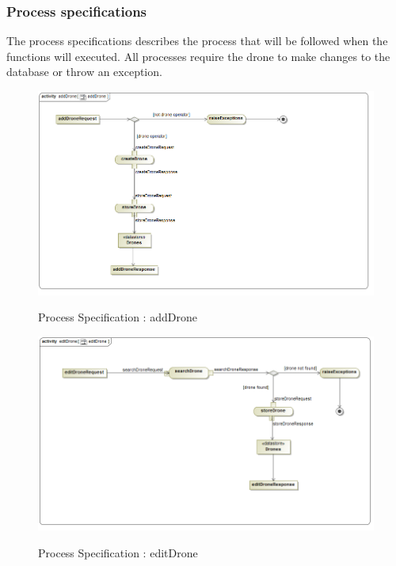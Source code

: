 \documentclass{article}
\begin{document}
	\subsubsection{Process specifications}
	The process specifications describes the process that will be followed when the functions will executed. All processes require the drone to make changes to the database or throw an exception.
		\begin{figure}[H]
			\includegraphics[width=\textwidth]{ps_add.png}  \\
			\caption{Process Specification : addDrone}
		\end{figure}
		\begin{figure}[H]
			\includegraphics[width=\textwidth]{ps_edit.png}  \\
			\caption{Process Specification : editDrone}
		\end{figure}
\end{document}
